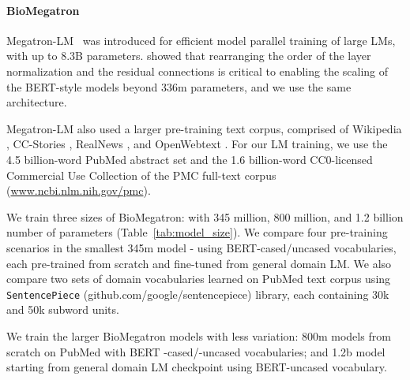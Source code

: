 \documentclass[11pt,a4paper]{article}
\begin{document}
\paragraph{BioMegatron}

Megatron-LM~\citep{shoeybi2019megatron} was introduced for efficient model parallel training of large LMs, with up to 8.3B parameters.
\citet{shoeybi2019megatron} showed that rearranging the order of the layer normalization and the residual connections is critical to enabling the scaling of the BERT-style models beyond 336m parameters, and we use the same architecture.

Megatron-LM also used a larger pre-training text corpus, comprised of Wikipedia \citep{devlin2018bert}, CC-Stories \citep{ccstories}, RealNews \citep{grover}, and OpenWebtext \cite{Radford2019GPT2}.
For our LM training, we use the 4.5 billion-word PubMed abstract set and the 1.6 billion-word CC0-licensed Commercial Use Collection of the PMC full-text corpus (\url{www.ncbi.nlm.nih.gov/pmc}).





We train three sizes of BioMegatron: with 345 million, 800 million, and 1.2 billion number of parameters (Table~\ref{tab:model_size}).
We compare four pre-training scenarios in the smallest 345m model - using BERT-cased/uncased vocabularies, each pre-trained from scratch and fine-tuned from general domain LM.
We also compare two sets of domain vocabularies learned on PubMed text corpus using \texttt{SentencePiece} (github.com/google/sentencepiece) library, each containing 30k and 50k subword units.

We train the larger BioMegatron models with less variation: 800m models from scratch on PubMed with BERT -cased/-uncased vocabularies; and 1.2b model starting from general domain LM checkpoint using BERT-uncased vocabulary.

\begin{table}
\footnotesize
\begin{center}
\caption{\label{tab:model_size}Model configurations.}
\end{center}
\end{table}
\end{document}
